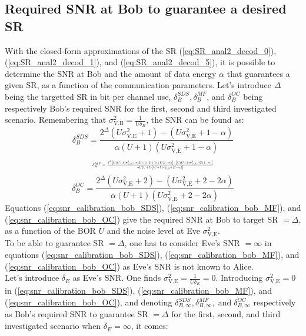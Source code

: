 \documentclass[journal,comsoc]{IEEEtran}
\begin{document}
\subsection{Required SNR at Bob to guarantee a desired SR}
 \label{sec:required-snr-at-bob-for-a-targetted-sr}
With the closed-form approximations of the SR (\ref{eq:SR_anal2_decod_0}), (\ref{eq:SR_anal2_decod_1}), and (\ref{eq:SR_anal2_decod_5}), it is possible to determine the SNR at Bob and the amount of data energy $\alpha$ that guarantees a given SR, as a function of the communication parameters. Let's introduce $\Delta$ being the targetted SR in bit per channel use, $\delta_B^{SDS}, \delta_B^{MF}$, and $\delta_B^{OC}$ being respectively Bob's required SNR for the first, second and third investigated scenario. Remembering that $\sigma^2_{\text{V,B}} = \frac{1}{U\delta_{B}}$, the SNR can be found as:
\begin{equation}
\delta_{B}^{SDS} = \frac{2^\Delta (U\sigma_{\text{V,E}}^2+1) - (U\sigma_{\text{V,E}}^2+1-\alpha) }{\alpha(U+1)(U\sigma_{\text{V,E}}^2+1-\alpha)}
\label{eq:snr_calibration_bob_SDS}
\end{equation}
\begin{equation}
\resizebox{.435 \textwidth}{!} 
{
	$\delta_{B}^{MF} = \frac{2^\Delta \left[U(U+1)\sigma_{\text{V,E}}^2 + \alpha(U+1)(U+3)+U(1-\alpha) \right] - \left[ U(U+1)\sigma_{\text{V,E}}^2+U(1-\alpha)\right] }{\alpha U(U+1)\left[(U+1)\sigma_{\text{V,E}}^2+(1-\alpha)\right]}$
}
	\label{eq:snr_calibration_bob_MF}
\end{equation}
\begin{equation}
\delta_{B}^{OC} = \frac{2^\Delta  (U\sigma_{\text{V,E}}^2+2) - (U\sigma_{\text{V,E}}^2+2-2\alpha) }{ \alpha(U+1)(U\sigma_{\text{V,E}}^2+2-2\alpha)}
\label{eq:snr_calibration_bob_OC}
\end{equation}
Equations (\ref{eq:snr_calibration_bob_SDS}), (\ref{eq:snr_calibration_bob_MF}), and (\ref{eq:snr_calibration_bob_OC})  give the required SNR at Bob to target SR $=\Delta$, as a function of the BOR $U$ and the noise level at Eve $\sigma_{\text{V,E}}^2$. \\
To be able to guarantee SR $=\Delta$, one has to consider Eve's SNR $= \infty$ in equations (\ref{eq:snr_calibration_bob_SDS}), (\ref{eq:snr_calibration_bob_MF}), and (\ref{eq:snr_calibration_bob_OC}) as Eve's SNR is not known to Alice.\\
Let's introduce $\delta_E$ as Eve's SNR. One finds $\sigma^2_{\text{V,E}} = \frac{1}{U\delta_{E}} = 0$. Introducing $ \sigma_{\text{V,E}}^2 = 0$ in (\ref{eq:snr_calibration_bob_SDS}), (\ref{eq:snr_calibration_bob_MF}), and (\ref{eq:snr_calibration_bob_OC}), and denoting $\delta_{B,\infty}^{SDS}, \delta_{B,\infty}^{MF}, \; \text{and}\;  \delta_{B,\infty}^{OC}$ respectively as Bob's required SNR to guarantee SR $=\Delta$ for the first, second, and third investigated scenario when $\delta_E = \infty$, it comes:
\end{document}
